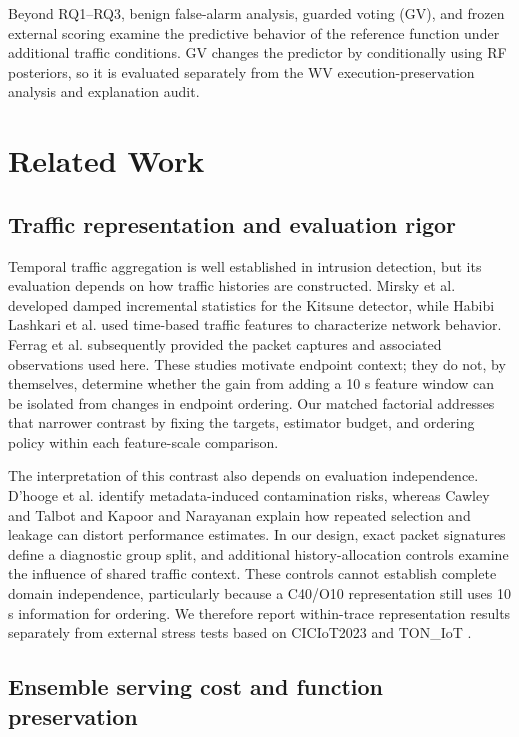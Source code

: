 \documentclass[final,3p,10pt,nopreprintline]{elsarticle}
\begin{document}
Beyond RQ1--RQ3, benign false-alarm analysis, guarded voting (GV), and frozen external scoring examine the predictive behavior of the reference function under additional traffic conditions. GV changes the predictor by conditionally using RF posteriors, so it is evaluated separately from the WV execution-preservation analysis and explanation audit.

\section{Related Work}

\subsection{Traffic representation and evaluation rigor}

Temporal traffic aggregation is well established in intrusion detection, but its evaluation depends on how traffic histories are constructed. Mirsky et al. \cite{r5} developed damped incremental statistics for the Kitsune detector, while Habibi Lashkari et al. \cite{r20} used time-based traffic features to characterize network behavior. Ferrag et al. \cite{r1} subsequently provided the packet captures and associated observations used here. These studies motivate endpoint context; they do not, by themselves, determine whether the gain from adding a 10 s feature window can be isolated from changes in endpoint ordering. Our matched factorial addresses that narrower contrast by fixing the targets, estimator budget, and ordering policy within each feature-scale comparison.

The interpretation of this contrast also depends on evaluation independence. D'hooge et al. \cite{r2} identify metadata-induced contamination risks, whereas Cawley and Talbot \cite{r3} and Kapoor and Narayanan \cite{r4} explain how repeated selection and leakage can distort performance estimates. In our design, exact packet signatures define a diagnostic group split, and additional history-allocation controls examine the influence of shared traffic context. These controls cannot establish complete domain independence, particularly because a C40/O10 representation still uses 10 s information for ordering. We therefore report within-trace representation results separately from external stress tests based on CICIoT2023 and TON\_IoT \cite{r27,r28,r29}.

\subsection{Ensemble serving cost and function preservation}
\end{document}
